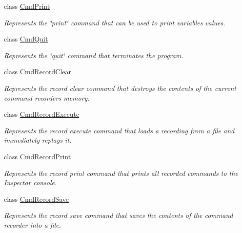 \begin{DoxyCompactItemize}
class \hyperlink{classgov_1_1nasa_1_1jpf_1_1inspector_1_1client_1_1commands_1_1_cmd_print}{Cmd\+Print}
\begin{DoxyCompactList}\small\item\em Represents the \char`\"{}print\char`\"{} command that can be used to print variables\textquotesingle{} values. \end{DoxyCompactList}\item 
class \hyperlink{classgov_1_1nasa_1_1jpf_1_1inspector_1_1client_1_1commands_1_1_cmd_quit}{Cmd\+Quit}
\begin{DoxyCompactList}\small\item\em Represents the \char`\"{}quit\char`\"{} command that terminates the program. \end{DoxyCompactList}\item 
class \hyperlink{classgov_1_1nasa_1_1jpf_1_1inspector_1_1client_1_1commands_1_1_cmd_record_clear}{Cmd\+Record\+Clear}
\begin{DoxyCompactList}\small\item\em Represents the \textquotesingle{}record clear\textquotesingle{} command that destroys the contents of the current command recorder\textquotesingle{}s memory. \end{DoxyCompactList}\item 
class \hyperlink{classgov_1_1nasa_1_1jpf_1_1inspector_1_1client_1_1commands_1_1_cmd_record_execute}{Cmd\+Record\+Execute}
\begin{DoxyCompactList}\small\item\em Represents the \textquotesingle{}record execute\textquotesingle{} command that loads a recording from a file and immediately replays it. \end{DoxyCompactList}\item 
class \hyperlink{classgov_1_1nasa_1_1jpf_1_1inspector_1_1client_1_1commands_1_1_cmd_record_print}{Cmd\+Record\+Print}
\begin{DoxyCompactList}\small\item\em Represents the \textquotesingle{}record print\textquotesingle{} command that prints all recorded commands to the Inspector console. \end{DoxyCompactList}\item 
class \hyperlink{classgov_1_1nasa_1_1jpf_1_1inspector_1_1client_1_1commands_1_1_cmd_record_save}{Cmd\+Record\+Save}
\begin{DoxyCompactList}\small\item\em Represents the \textquotesingle{}record save\textquotesingle{} command that saves the contents of the command recorder into a file. \end{DoxyCompactList}\item 

\end{DoxyCompactItemize}

